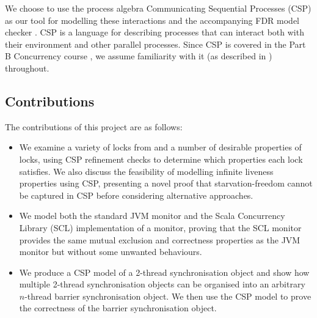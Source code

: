 
We choose to use the process algebra Communicating Sequential Processes (CSP) \cite{RoscoeUCS} as our tool for modelling these interactions and the accompanying FDR model checker \cite{GibsonFDR}. CSP is a language for describing processes that can interact both with their environment and other parallel processes. Since CSP is covered in the Part B Concurrency course \cite{Concurrency}, we assume familiarity with it (as described in \cite{RoscoeUCS}) throughout.



\subsection{Contributions}

The contributions of this project are as follows:

\begin{itemize}
  \item We examine a variety of locks from \cite{CADS} and a number of desirable properties of locks, using CSP refinement checks to determine which properties each lock satisfies. We also discuss the feasibility of modelling infinite liveness properties using CSP, presenting a novel proof that starvation-freedom cannot be captured in CSP before considering alternative approaches.%
  \item We model both the standard JVM monitor and the Scala Concurrency Library (SCL) \cite{CP} implementation of a monitor, proving that the SCL monitor provides the same mutual exclusion and correctness properties as the JVM monitor but without some unwanted behaviours.
  \item We produce a CSP model of a 2-thread synchronisation object and show how multiple 2-thread synchronisation objects can be organised into an arbitrary $n$-thread barrier synchronisation object. We then use the CSP model to prove the correctness of the barrier synchronisation object.
\end{itemize}



